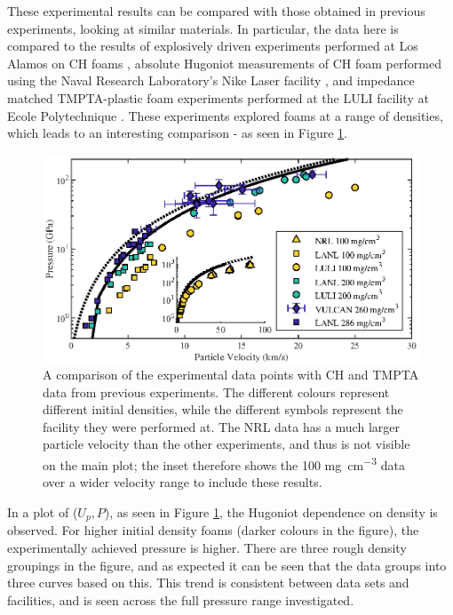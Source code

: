 These experimental results can be compared with those obtained in previous experiments, looking at similar materials. In particular, the data here is compared to the results of explosively driven experiments performed at Los Alamos on CH foams \cite{Marsh1980}, absolute Hugoniot  measurements of CH foam performed using the Naval Research Laboratory's Nike Laser facility \cite{Aglitskiy2018}, and impedance matched TMPTA-plastic foam experiments performed at the LULI facility at Ecole Polytechnique \cite{Koenig1999}. These experiments explored foams at a range of densities, which leads to an interesting comparison - as seen in Figure \ref{fig:Other Foam Data}.

\begin{figure} [h!]
\begin{centering}
\includegraphics[width=1.0\textwidth]{figures/Experiment/OtherDataUpP_wide.eps}%
\caption{\label{fig:Other Foam Data} A comparison of the experimental data points with CH and TMPTA data from previous experiments. The different colours represent different initial densities, while the different symbols represent the facility they were performed at. The NRL data has a much larger particle velocity than the other experiments, and thus is not visible on the main plot; the inset therefore shows the 100 \unit{\milli\gram\per\centi\meter\cubed} data over a wider velocity range to include these results. }
\end{centering}
\end{figure}

In a plot of ($U_p,P$), as seen in Figure \ref{fig:Other Foam Data}, the Hugoniot dependence on density is observed. For higher initial density foams (darker colours in the figure), the experimentally achieved pressure is higher. There are three rough density groupings in the figure, and as expected it can be seen that the data groups into three curves based on this. This trend is consistent between data sets and facilities, and is seen across the full pressure range investigated.

